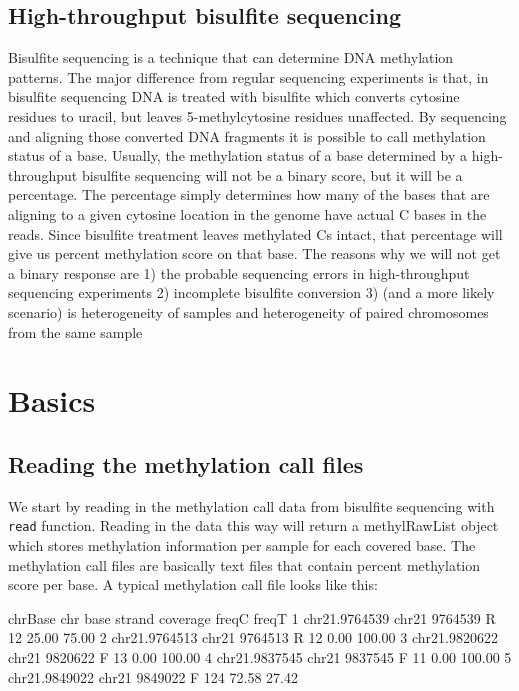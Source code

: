 \documentclass{article}
\begin{document}
\subsection{High-throughput bisulfite sequencing}
Bisulfite sequencing is a technique that can determine DNA methylation patterns. The major difference from regular sequencing experiments is that, in bisulfite sequencing DNA is treated with bisulfite which converts cytosine residues to uracil, but leaves 5-methylcytosine residues unaffected. By sequencing and aligning those converted DNA fragments it is possible to call methylation status of a base. Usually, the methylation status of a base determined by a high-throughput bisulfite sequencing will not be a binary score, but it will be a percentage. The percentage simply determines how many of the bases that are aligning to a given cytosine location in the genome have actual C bases in the reads. Since bisulfite treatment leaves methylated Cs intact, that percentage will give us percent methylation score on that base. The reasons why we will not get a binary response are 1) the probable sequencing errors in high-throughput sequencing experiments 2) incomplete bisulfite conversion 3) (and a more likely scenario) is heterogeneity of samples and heterogeneity of paired chromosomes from the same sample 




\section{Basics}
\subsection{Reading the methylation call files}
We start by reading in the methylation call data from bisulfite
sequencing with \texttt{read} function. Reading in the data this way
will return a methylRawList object which stores methylation
information per sample for each covered base. The methylation call files are basically text
files that contain percent methylation score per base. A typical methylation call file looks like this:
\begin{Schunk}
\begin{Soutput}
        chrBase   chr    base strand coverage freqC  freqT
1 chr21.9764539 chr21 9764539      R       12 25.00  75.00
2 chr21.9764513 chr21 9764513      R       12  0.00 100.00
3 chr21.9820622 chr21 9820622      F       13  0.00 100.00
4 chr21.9837545 chr21 9837545      F       11  0.00 100.00
5 chr21.9849022 chr21 9849022      F      124 72.58  27.42
\end{Soutput}
\end{Schunk}
\end{document}
